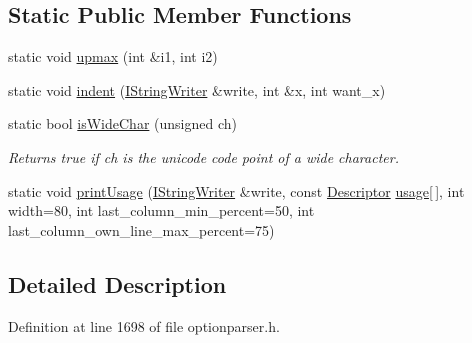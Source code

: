 \subsection*{Static Public Member Functions}
\begin{DoxyCompactItemize}
\item 
static void \hyperlink{struct_option_parser_1_1_print_usage_implementation_a8517859ff8d035d78b4a5c137be4dab0}{upmax} (int \&i1, int i2)
\item 
static void \hyperlink{struct_option_parser_1_1_print_usage_implementation_a4a5d3f07d96ef1bbf7623053d5a5cd48}{indent} (\hyperlink{struct_option_parser_1_1_print_usage_implementation_1_1_i_string_writer}{I\-String\-Writer} \&write, int \&x, int want\-\_\-x)
\item 
static bool \hyperlink{struct_option_parser_1_1_print_usage_implementation_a8e21f84e8fb97ceb650973c5918e597c}{is\-Wide\-Char} (unsigned ch)
\begin{DoxyCompactList}\small\item\em Returns true if ch is the unicode code point of a wide character. \end{DoxyCompactList}\item 
static void \hyperlink{struct_option_parser_1_1_print_usage_implementation_a3d6989a844051e264fd59bf56262a4c8}{print\-Usage} (\hyperlink{struct_option_parser_1_1_print_usage_implementation_1_1_i_string_writer}{I\-String\-Writer} \&write, const \hyperlink{struct_option_parser_1_1_descriptor}{Descriptor} \hyperlink{_community_detection_8cpp_ae4e685e845abde182eb8fc1f87b756ae}{usage}\mbox{[}$\,$\mbox{]}, int width=80, int last\-\_\-column\-\_\-min\-\_\-percent=50, int last\-\_\-column\-\_\-own\-\_\-line\-\_\-max\-\_\-percent=75)
\end{DoxyCompactItemize}


\subsection{Detailed Description}


Definition at line 1698 of file optionparser.\-h.



